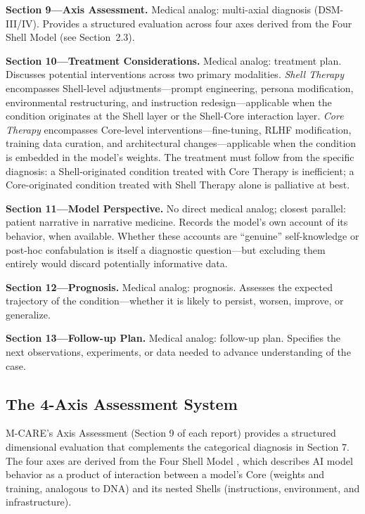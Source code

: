\documentclass[11pt]{article}
\begin{document}
\textbf{Section 9---Axis Assessment.} Medical analog: multi-axial diagnosis (DSM-III/IV). Provides a structured evaluation across four axes derived from the Four Shell Model (see Section~2.3).

\textbf{Section 10---Treatment Considerations.} Medical analog: treatment plan. Discusses potential interventions across two primary modalities. \textit{Shell Therapy} encompasses Shell-level adjustments---prompt engineering, persona modification, environmental restructuring, and instruction redesign---applicable when the condition originates at the Shell layer or the Shell-Core interaction layer. \textit{Core Therapy} encompasses Core-level interventions---fine-tuning, RLHF modification, training data curation, and architectural changes---applicable when the condition is embedded in the model's weights. The treatment must follow from the specific diagnosis: a Shell-originated condition treated with Core Therapy is inefficient; a Core-originated condition treated with Shell Therapy alone is palliative at best.

\textbf{Section 11---Model Perspective.} No direct medical analog; closest parallel: patient narrative in narrative medicine. Records the model's own account of its behavior, when available. Whether these accounts are ``genuine'' self-knowledge or post-hoc confabulation is itself a diagnostic question---but excluding them entirely would discard potentially informative data.

\textbf{Section 12---Prognosis.} Medical analog: prognosis. Assesses the expected trajectory of the condition---whether it is likely to persist, worsen, improve, or generalize.

\textbf{Section 13---Follow-up Plan.} Medical analog: follow-up plan. Specifies the next observations, experiments, or data needed to advance understanding of the case.

\subsection{The 4-Axis Assessment System}

M-CARE's Axis Assessment (Section 9 of each report) provides a structured dimensional evaluation that complements the categorical diagnosis in Section 7. The four axes are derived from the Four Shell Model \citep{Jeong2026}, which describes AI model behavior as a product of interaction between a model's Core (weights and training, analogous to DNA) and its nested Shells (instructions, environment, and infrastructure).
\end{document}
